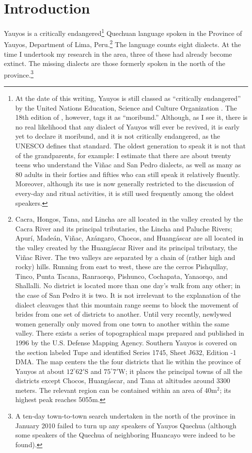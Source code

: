 \chapter{Introduction}\label{ch:introduction}
Yauyos is a critically endangered\footnote{At the date of this writing, Yauyos is still classed as ``critically endangered'' by the United Nations Education, Science and Culture Organization \citep{UNESCO}. The 18th edition of \underline{} \citep{ethnologue}, however, tags it as ``moribund.'' Although, as I see it, there is no real likelihood that any dialect of Yauyos will ever be revived, it is early yet to declare it moribund, and it is not critically endangered, as the UNESCO defines that standard. The oldest generation to speak it is not that of the grandparents, for example: I estimate that there are about twenty teens who understand the Vi\~nac and San Pedro dialects, as well as many as 80 adults in their forties and fifties who can still speak it relatively fluently. Moreover, although its use is now generally restricted to the discussion of every-day and ritual activities, it is still used frequently among the oldest speakers.} Quechuan language spoken in the Province of Yauyos, Department of Lima, Peru.\footnote{Cacra, Hongos, Tana, and Lincha are all located in the valley created by the Cacra River and its principal tributaries, the Lincha and Paluche Rivers; Apur\'i, Made\'an, Vi\~nac, Az\'angaro, Chocos, and Huang\'ascar are all located in the valley created by the Huang\'ascar River and its principal tributary, the Vi\~nac River. The two valleys are separated by a chain of (rather high and rocky) hills. Running from east to west, these are the cerros Pishqullay, Tinco, Punta Tacana, Ranraorqo, Pishunco, Cochapata, Yanaorqo, and Shallalli. No district is located more than one day's walk from any other; in the case of San Pedro it is two. It is not irrelevant to the explanation of the dialect cleavages that this mountain range seems to block the movement of brides from one set of districts to another. Until very recently, newlywed women generally only moved from one town to another within the same valley. There exists a series of topographical maps prepared and published in 1996 by the U.S. Defense Mapping Agency. Southern Yauyos is covered on the section labeled Tupe and identified Series 1745, Sheet J632, Edition -1 DMA. The map centers the the four districts that lie within the province of Yauyos at about $12^\circ62'$S and $75^\circ7'$W; it places the principal towns of all the districts except Chocos, Huang\'ascar, and Tana at altitudes around 3300 meters. The relevant region can be contained within an area of 40m$^2$; its highest peak reaches 5055m.} The language counts eight dialects. At the time I undertook my research in the area, three of these had already become extinct. The missing dialects are those formerly spoken in the north of the province.\footnote{A ten-day town-to-town search undertaken in the north of the province in January 2010 failed to turn up any speakers of Yauyos Quechua (although some speakers of the Quechua of neighboring Huancayo were indeed to be found).} 
